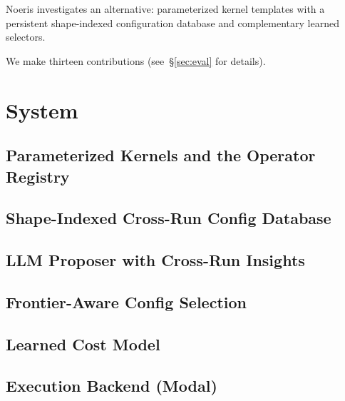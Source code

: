 \documentclass{article}
\begin{document}
Noeris investigates an alternative: parameterized kernel templates with a
persistent shape-indexed configuration database and complementary
learned selectors.

We make thirteen contributions (see~\S\ref{sec:eval} for details).

\section{System}
\label{sec:system}


\subsection{Parameterized Kernels and the Operator Registry}
\label{sec:operator-registry}

\subsection{Shape-Indexed Cross-Run Config Database}
\label{sec:config-db}

\subsection{LLM Proposer with Cross-Run Insights}
\label{sec:llm-proposer}

\subsection{Frontier-Aware Config Selection}
\label{sec:frontier}

\subsection{Learned Cost Model}
\label{sec:cost-model}

\subsection{Execution Backend (Modal)}
\label{sec:modal}

\end{document}
